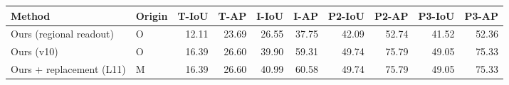 \begin{tabular}{llrrrrrrrr}
\toprule
Method & Origin & T-IoU & T-AP & I-IoU & I-AP & P2-IoU & P2-AP & P3-IoU & P3-AP \\
\midrule
Ours (regional readout) & O & 12.11 & 23.69 & 26.55 & 37.75 & 42.09 & 52.74 & 41.52 & 52.36 \\
Ours (v10) & O & 16.39 & 26.60 & 39.90 & 59.31 & 49.74 & 75.79 & 49.05 & 75.33 \\
Ours + replacement (L11) & M & 16.39 & 26.60 & 40.99 & 60.58 & 49.74 & 75.79 & 49.05 & 75.33 \\
\bottomrule
\end{tabular}

